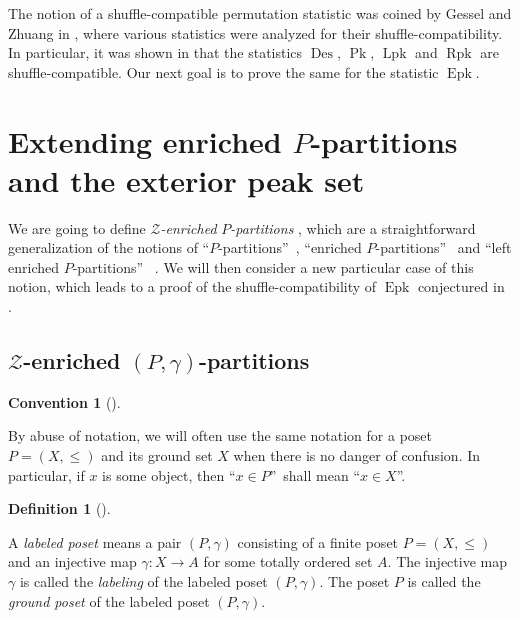 \documentclass[numbers=enddot,12pt,final,onecolumn,notitlepage]{scrartcl}%
\theoremstyle{definition}
\newtheorem{defi}[theo]{Definition}
\newenvironment{definition}[1][]
{\begin{defi}[#1]\begin{leftbar}}
{\end{leftbar}\end{defi}}
\newtheorem{conv}[theo]{Convention}
\newenvironment{convention}[1][]
{\begin{conv}[#1]\begin{leftbar}}
{\end{leftbar}\end{conv}}
\newenvironment{convention}[1][Convention]{\noindent\textbf{#1.} }{\ \rule{0.5em}{0.5em}}
\begin{document}
The notion of a shuffle-compatible permutation statistic was coined by Gessel
and Zhuang in \cite{part1}, where various statistics were analyzed for their
shuffle-compatibility. In particular, it was shown in \cite{part1} that the
statistics $\operatorname*{Des}$, $\operatorname*{Pk}$, $\operatorname*{Lpk}$
and $\operatorname*{Rpk}$ are shuffle-compatible. Our next goal is to prove
the same for the statistic $\operatorname*{Epk}$.

\section{\label{sect.Zenri}Extending enriched $P$-partitions and the exterior
peak set}

We are going to define \textit{$\mathcal{Z}$-enriched }$P$\textit{-partitions}%
, which are a straightforward generalization of the notions of
\textquotedblleft$P$-partitions\textquotedblright\ \cite{Stanle72},
\textquotedblleft enriched $P$-partitions\textquotedblright\ \cite[\S 2]{Stembr97}
and \textquotedblleft left enriched $P$-partitions\textquotedblright
\ \cite{Peters05}. We will then consider a new particular case
of this notion, which leads to a proof of the shuffle-compatibility of
$\operatorname*{Epk}$ conjectured in \cite{part1}.

\subsection{\label{subsect.Zenri.gen}$\mathcal{Z}$-enriched $\left(
P,\gamma\right)  $-partitions}

\begin{convention}
By abuse of notation, we will often use the same notation for a poset
$P=\left(  X,\leq\right)  $ and its ground set $X$ when there is no danger of
confusion. In particular, if $x$ is some object, then \textquotedblleft$x\in
P$\textquotedblright\ shall mean \textquotedblleft$x\in X$\textquotedblright.
\end{convention}

\begin{definition}
A \textit{labeled poset} means a pair $\left(  P,\gamma\right)  $ consisting
of a finite poset $P=\left(  X,\leq\right)  $ and an injective map
$\gamma:X\rightarrow A$ for some totally ordered set $A$. The injective map
$\gamma$ is called the \textit{labeling} of the labeled poset $\left(
P,\gamma\right)  $. The poset $P$ is called the \textit{ground poset} of the
labeled poset $\left(  P,\gamma\right)  $.
\end{definition}
\end{document}
